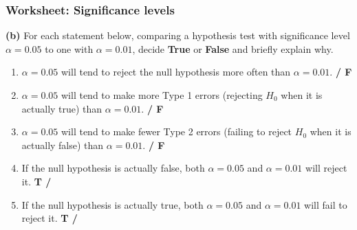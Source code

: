 \documentclass[t,compress,mathserif]{beamer}
\begin{document}


\begin{frame}
\frametitle{Worksheet: Significance levels}

\textbf{(b)} For each statement below, comparing a hypothesis test
with significance level $\alpha = 0.05$ to one with
$\alpha = 0.01$, decide \textbf{True} or \textbf{False}
and briefly explain why.

\begin{enumerate}
  \item $\alpha = 0.05$ will tend to reject the null hypothesis
  more often than $\alpha = 0.01$.
  \hfill \textbf{ / F}

  \item $\alpha = 0.05$ will tend to make more Type 1 errors
  (rejecting $H_0$ when it is actually true) than $\alpha = 0.01$.
  \hfill \textbf{ / F}

  \item $\alpha = 0.05$ will tend to make fewer Type 2 errors
  (failing to reject $H_0$ when it is actually false) than
  $\alpha = 0.01$.
  \hfill \textbf{ / F}

  \item If the null hypothesis is actually false, both
  $\alpha = 0.05$ and $\alpha = 0.01$ will reject it.
  \hfill \textbf{T / }

  \item If the null hypothesis is actually true, both
  $\alpha = 0.05$ and $\alpha = 0.01$ will fail to reject it.
  \hfill \textbf{T / }
\end{enumerate}

\end{frame}
\end{document}
